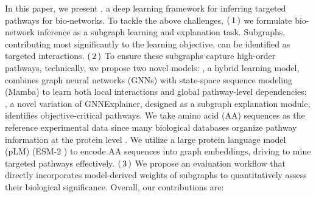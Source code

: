 In this paper, we present \method, a deep learning framework for inferring targeted pathways for bio-networks.
To tackle the above challenges,
$\rm(\hspace{.18em}1\hspace{.18em})$ we formulate bio-network inference as a subgraph learning and explanation task.
Subgraphs, contributing most significantly to the learning objective, can be identified as targeted interactions.
$\rm(\hspace{.18em}2\hspace{.18em})$ To ensure these subgraphs capture high-order pathways, technically, we propose two novel models:
\classifier, a hybrid learning model, combines graph neural networks (GNNs) with state-space sequence modeling (Mamba) to learn both local interactions and global pathway-level dependencies;
\explainer, a novel variation of GNNExplainer, designed as a subgraph explanation module, identifies objective-critical pathways.
We take amino acid (AA) sequences as the reference experimental data since many biological databases organize pathway information at the protein level \cite{PDB1}. 
We utilize a large protein language model (pLM) (ESM-2 \cite{ESM}) to encode AA sequences into graph embeddings, driving \method to mine targeted pathways effectively.
$\rm(\hspace{.18em}3\hspace{.18em})$ We propose an evaluation workflow that directly incorporates model-derived weights of subgraphs to quantitatively assess their biological significance.
Overall, our contributions are:
